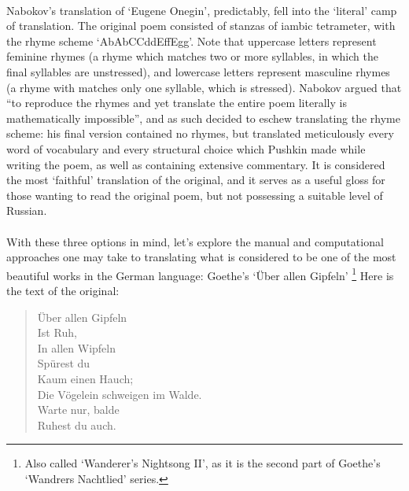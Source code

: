   \paragraph{}{Nabokov's translation of `Eugene Onegin', predictably,
    fell into the `literal' camp of translation. The original poem
    consisted of stanzas of iambic tetrameter, with the rhyme scheme
    `AbAbCCddEffEgg'. Note that uppercase letters represent
      feminine rhymes (a rhyme which matches two or more syllables, in
      which the final syllables are unstressed), and lowercase letters
      represent masculine rhymes (a rhyme with matches only one
      syllable, which is stressed). Nabokov argued that ``to
    reproduce the rhymes and yet translate the entire poem literally
    is mathematically impossible'', and as such decided to eschew
    translating the rhyme scheme: his final version contained no
    rhymes, but translated meticulously every word of vocabulary and
    every structural choice which Pushkin made while writing the poem,
    as well as containing extensive commentary. It is considered the
    most `faithful' translation of the original, and it serves as a
    useful gloss for those wanting to read the original poem, but not
    possessing a suitable level of Russian.  }

  \paragraph{}{With these three options in mind, let's explore the
    manual and computational approaches one may take to translating
    what is considered to be one of the most beautiful works in the
    German language\cite{goethe}: Goethe's `{\"U}ber allen Gipfeln'
  \footnote{Also called `Wanderer's Nightsong II', as it is the
      second part of Goethe's `Wandrers Nachtlied' series. } Here is
    the text of the original: \\}

\begin{minipage}{0.8\linewidth}
  \begin{verse}

    {\"U}ber allen Gipfeln \\
    Ist Ruh, \\
    In allen Wipfeln \\
    Sp{\"u}rest du \\
    Kaum einen Hauch; \\
    Die V{\"o}gelein schweigen im Walde. \\
    Warte nur, balde \\
    Ruhest du auch.
  \end{verse}
\end{minipage}

